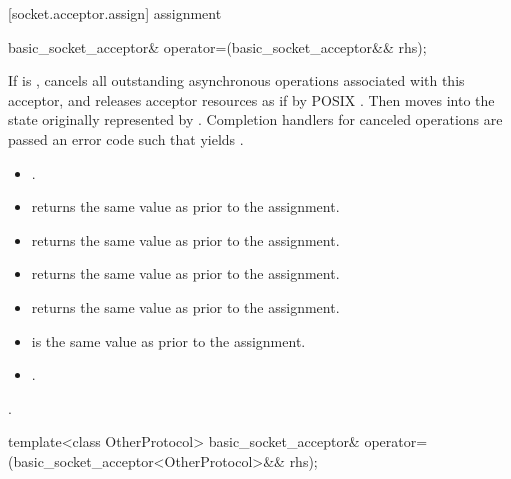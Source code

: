 [socket.acceptor.assign]{ assignment}

\begin{itemdecl}
basic_socket_acceptor& operator=(basic_socket_acceptor&& rhs);
\end{itemdecl}

\begin{itemdescr}
\pnum
\effects If  is , cancels all outstanding asynchronous operations associated with this acceptor, and releases acceptor resources as if by POSIX . Then moves into  the state originally represented by . Completion handlers for canceled operations are passed an error code  such that  yields .

\pnum
\postconditions
\begin{itemize}
\item
{}.
\item
{} returns the same value as  prior to the assignment.
\item
{} returns the same value as  prior to the assignment.
\item
{} returns the same value as  prior to the assignment.
\item
{} returns the same value as  prior to the assignment.
\item
{} is the same value as  prior to the assignment.
\item
{}.
\end{itemize}

\pnum
\returns {}.
\end{itemdescr}

\begin{itemdecl}
template<class OtherProtocol>
  basic_socket_acceptor& operator=(basic_socket_acceptor<OtherProtocol>&& rhs);
\end{itemdecl}

